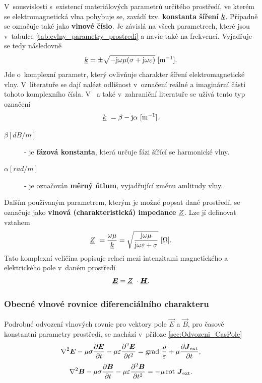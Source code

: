 V~sousvislosti s~existencí materiálových parametrů určitého prostředí, ve kterém se elektromagnetická vlna pohybuje se, zavádí tzv. {\bf konstanta šíření} ${\underline{k}}$. Případně se označuje také jako {\bf vlnové číslo}. Je závislá na všech parametrech, které jsou v~tabulce \ref{tab:evlny_parametry_prostredi} a navíc také na frekvenci. Vyjadřuje se tedy následovně
\begin{displaymath}
	{\underline{k}}=\pm\sqrt{-\mathrm{j}\omega\mu(\sigma+\mathrm{j}\omega\varepsilon)}\mathrm{\ [m^{-1}]}.
\end{displaymath}
Jde o~komplexní parametr, který ovlivňuje charakter šíření elektromagnetické vlny. V~literatuře se dají nalézt odlišnost v~označení reálné a imaginární  části tohoto komplexního čísla. V~\cite{emp} a také v~zahraniční literatuře se užívá tento typ označení 
\begin{equation}
	{\underline{k}}~= \beta - \mathrm{j}\alpha\mathrm{\ [m^{-1}]}.
	\label{rce:evlny_alphabeta}
\end{equation}
\begin{description}
\item[$\beta\unit{[dB/m]}$] - je {\bf fázová konstanta}, která určuje fázi šířící se harmonické vlny.
\item[$\alpha\unit{[rad/m]}$] - je označován {\bf měrný útlum}, vyjadřující změnu amlitudy vlny.
\end{description}

Dalším používaným parametrem, kterým je možné popsat dané prostředí, se označuje jako {\bf vlnová (charakteristická) impedance}  ${\underline{Z}}$. Lze jí definovat vztahem
\begin{displaymath}
	{\underline{Z}}~= \frac{\omega\mu}{{\underline{k}}} = \sqrt{\frac{\mathrm{j}\omega\mu}{\mathrm{j}\omega\varepsilon + \sigma}}\mathrm{\ [\Omega]}.
\end{displaymath}
Tato komplexní veličina popisuje relaci mezi intenzitami magnetického a elektrického pole v~daném prostředí
\begin{displaymath}
	\mbox{\underline{\boldmath$E$}} = {\underline{Z}}~\cdot \mbox{\underline{\boldmath$H$}}.
\end{displaymath}

\subsubsection*{Obecné vlnové rovnice diferenciálního charakteru}
 Podrobné odvození vlnových rovnic pro vektory pole $\vec E$ a $\vec B$, pro časově konstantní parametry prostředí, se nachází v~příloze \ref{sec:Odvozeni_CasPole}
\begin{equation}
	\nabla^{2}\mbox{\boldmath$E$} -\mu\sigma\frac{\partial\mbox{\boldmath$E$}}{\partial t}-\mu\varepsilon\frac{\partial^{2}\mbox{\boldmath$E$}}{\partial t^{2}} = \mathrm{grad}\ \frac{\rho}{\varepsilon}+\mu\frac{\partial\mbox{\boldmath$J$}_{\mathrm{ext}}}{\partial t},
	\label{rce:evlny_VlnR_ElPole}
\end{equation}
\begin{equation}
	\nabla^{2}\mbox{\boldmath$B$} -\mu\sigma\frac{\partial\mbox{\boldmath$B$}}{\partial t}-\mu\varepsilon\frac{\partial^{2}\mbox{\boldmath$B$}}{\partial t^{2}}= -\mu\,\mathrm{rot}\ \mbox{\boldmath$J$}_{\mathrm{ext}}.
	\label{rce:evlny_VlnR_MagPole}
\end{equation}

